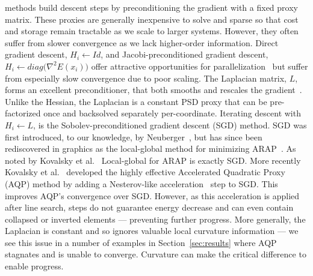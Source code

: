  methods build descent steps by preconditioning the gradient with a fixed proxy matrix. These proxies are generally inexpensive to solve and sparse so that cost and storage remain tractable as we scale to larger systems. However, they often suffer from slower convergence as we lack higher-order information.
%
Direct gradient descent, $H_i \leftarrow Id$, and Jacobi-preconditioned gradient descent, $H_i \leftarrow diag(\nabla^2 E(x_i)\big)$ offer attractive opportunities for parallelization~\cite{Wang:2016:DMF,Fu:2015:CLI} but suffer from especially slow convergence due to poor scaling.
%
The Laplacian matrix, $L$, forms an excellent preconditioner, that both smooths and rescales the gradient~\cite{Neuberger:1985:SDA,Martin:2013:ENL,Kovalsky:2016:AQP}. Unlike the Hessian, the Laplacian is a constant PSD proxy that can be pre-factorized once and backsolved separately per-coordinate. Iterating descent with $H_i \leftarrow L$, is the Sobolev-preconditioned gradient descent (SGD) method. SGD was first introduced, to our knowledge, by Neuberger~, but has since been rediscovered in graphics as the local-global method for minimizing ARAP~\cite{Sorkine:2007:ARA}. As noted by Kovalsky et al.\  Local-global for ARAP is exactly SGD.
More recently Kovalsky et al.~ developed the highly effective Accelerated Quadratic Proxy (AQP) method by adding a Nesterov-like acceleration~\cite{Nesterov:1983:AMO} step to SGD. This improves AQP's convergence over SGD. However, as this acceleration is applied after line search, steps do not guarantee energy decrease and can even contain collapsed or inverted elements --- preventing further progress. More generally, the Laplacian is
constant and so ignores valuable local curvature information ---
we see this issue in a number of examples in Section~\ref{sec:results}
where AQP stagnates and is unable to converge. Curvature can make
the critical difference to enable progress.

